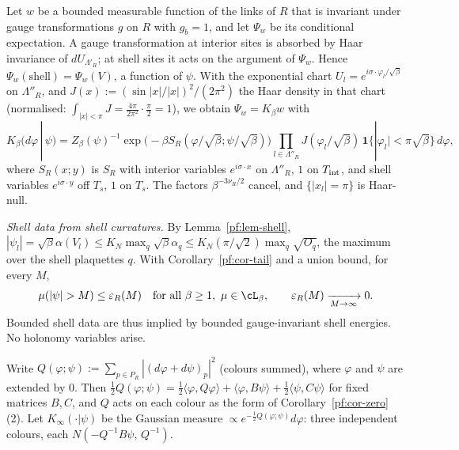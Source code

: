 Let $w$ be a bounded measurable function of the links of $R$ that is invariant under gauge transformations $g$ on $R$ with $g_b=1$, and let $\Psi_w$ be its conditional expectation. A gauge transformation at interior sites is absorbed by Haar invariance of $dU_{\Lambda'_R}$; at shell sites it acts on the argument of $\Psi_w$. Hence $\Psi_w(\text{shell})=\Psi_w(V)$, a function of $\psi$. With the exponential chart $U_l=e^{i\sigma\cdot\varphi_l/\sqrt\beta}$ on $\Lambda''_R$, and $J(x):=(\sin|x|/|x|)^2/(2\pi^2)$ the Haar density in that chart (normalised: $\int_{|x|<\pi}J=\frac{4\pi}{2\pi^2}\cdot\frac\pi2=1$), we obtain $\Psi_w=K_\beta w$ with
\begin{equation}\label{pf:eq-Kbeta}
K_\beta(d\varphi\,|\,\psi)=Z_\beta(\psi)^{-1}\exp\big(-\beta S_R(\varphi/\sqrt\beta;\psi/\sqrt\beta)\big)\prod_{l\in\Lambda''_R}J(\varphi_l/\sqrt\beta)\,\mathbf 1\{|\varphi_l|<\pi\sqrt\beta\}\,d\varphi,
\end{equation}
where $S_R(x;y)$ is $S_R$ with interior variables $e^{i\sigma\cdot x}$ on $\Lambda''_R$, $1$ on $T_{\rm int}$, and shell variables $e^{i\sigma\cdot y}$ off $T_s$, $1$ on $T_s$. The factors $\beta^{-3\nu_R/2}$ cancel, and $\{|x_l|=\pi\}$ is Haar-null.

\emph{Shell data from shell curvatures.} By Lemma~\ref{pf:lem-shell}, $|\psi_l|=\sqrt\beta\alpha(V_l)\le K_N\max_q\sqrt\beta\alpha_q\le K_N(\pi/\sqrt2)\max_q\sqrt{O_q}$, the maximum over the shell plaquettes $q$. With Corollary~\ref{pf:cor-tail} and a union bound, for every $M$,
\begin{equation}\label{pf:eq-epsM}
\mu(|\psi|>M)\le\varepsilon_R(M)\quad\text{for all }\beta\ge1,\ \mu\in\cL_\beta,\qquad\varepsilon_R(M)\xrightarrow[M\to\infty]{}0.
\end{equation}
Bounded shell data are thus implied by bounded gauge-invariant shell energies. No holonomy variables arise.

Write $Q(\varphi;\psi):=\sum_{p\in P_R}|(d\varphi+d\psi)_p|^2$ (colours summed), where $\varphi$ and $\psi$ are extended by $0$. Then $\tfrac12Q(\varphi;\psi)=\tfrac12\langle\varphi,Q\varphi\rangle+\langle\varphi,B\psi\rangle+\tfrac12\langle\psi,C\psi\rangle$ for fixed matrices $B,C$, and $Q$ acts on each colour as the form of Corollary~\ref{pf:cor-zero}(2). Let $K_\infty(\cdot|\psi)$ be the Gaussian measure $\propto e^{-\frac12Q(\varphi;\psi)}d\varphi$: three independent colours, each $N(-Q^{-1}B\psi,\,Q^{-1})$.

